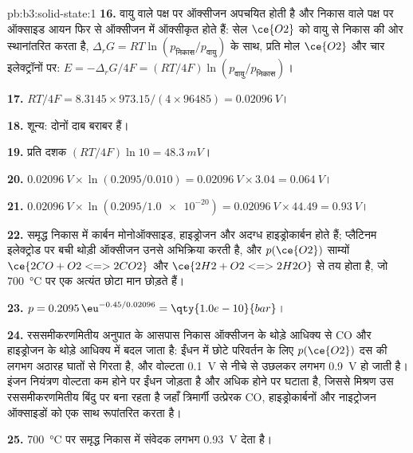 \begin{solution}{pb:b3:solid-state:1}
\textbf{16.} वायु वाले पक्ष पर ऑक्सीजन अपचयित होती है और निकास वाले पक्ष पर ऑक्साइड आयन फिर से
ऑक्सीजन में ऑक्सीकृत होते हैं: सेल $\ce{O2}$ को वायु से निकास की ओर स्थानांतरित करता है,
$\Delta_rG = RT\ln(p_{\text{निकास}}/p_{\text{वायु}})$ के साथ, प्रति मोल $\ce{O2}$ और चार इलेक्ट्रॉनों पर: $E = -\Delta_rG/4F = (RT/4F)\ln(p_{\text{वायु}}/p_{\text{निकास}})$।

\textbf{17.} $RT/4F = 8.3145 \times 973.15/(4 \times 96485) = \qty{0.02096}{V}$।

\textbf{18.} शून्य: दोनों दाब बराबर हैं।

\textbf{19.} प्रति दशक $(RT/4F)\ln 10 = \qty{48.3}{mV}$।

\textbf{20.} $\qty{0.02096}{V} \times \ln(0.2095/0.010) = \qty{0.02096}{V} \times 3.04 = \qty{0.064}{V}$।

\textbf{21.} $\qty{0.02096}{V} \times \ln(0.2095/\num{1.0e-20}) = \qty{0.02096}{V} \times 44.49 = \qty{0.93}{V}$।

\textbf{22.} समृद्ध निकास में कार्बन मोनोऑक्साइड, हाइड्रोजन और अदग्ध
हाइड्रोकार्बन होते हैं; प्लैटिनम इलेक्ट्रोड पर बची थोड़ी ऑक्सीजन उनसे अभिक्रिया करती है,
और $p(\ce{O2})$ साम्यों $\ce{2CO + O2 <=> 2CO2}$ और $\ce{2H2 + O2 <=> 2H2O}$ से तय होता है, जो \qty{700}{\celsius} पर एक अत्यंत छोटा
मान छोड़ते हैं।

\textbf{23.} $p = 0.2095\,\eu^{-0.45/0.02096} = \qty{1.0e-10}{bar}$।

\textbf{24.} रससमीकरणमितीय अनुपात के आसपास निकास ऑक्सीजन के थोड़े आधिक्य से
CO और हाइड्रोजन के थोड़े आधिक्य में बदल जाता है: ईंधन में छोटे परिवर्तन के लिए $p(\ce{O2})$ दस की लगभग अठारह
घातों से गिरता है, और वोल्टता
\qty{0.1}{V} से नीचे से उछलकर लगभग \qty{0.9}{V} हो जाती है। इंजन नियंत्रण वोल्टता कम होने पर ईंधन जोड़ता है और
अधिक होने पर घटाता है, जिससे मिश्रण उस रससमीकरणमितीय बिंदु पर बना रहता है जहाँ
त्रिमार्गी उत्प्रेरक CO, हाइड्रोकार्बनों और नाइट्रोजन ऑक्साइडों को एक साथ रूपांतरित करता है।

\textbf{25.} \qty{700}{\celsius} पर समृद्ध निकास में संवेदक लगभग \qty{0.93}{V} देता है।
\end{solution}
